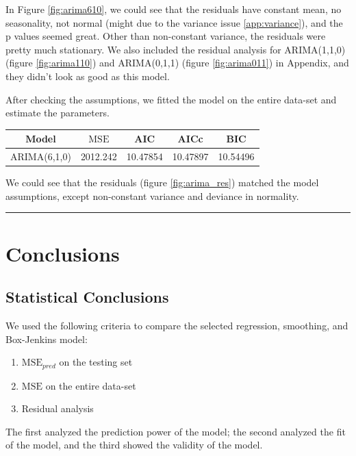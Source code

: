 \documentclass[paper=letter, fontsize=11pt]{scrartcl}
\begin{document}
In Figure \ref{fig:arima610}, we could see that the residuals have constant mean, no seasonality, not normal (might due to the variance issue \ref{app:variance}), and the p values seemed great. Other than non-constant variance, the residuals were pretty much stationary. 
We also included the residual analysis for ARIMA(1,1,0) (figure \ref{fig:arima110}) and ARIMA(0,1,1) (figure \ref{fig:arima011}) in Appendix, and they didn't look as good as this model.

After checking the assumptions, we fitted the model on the entire data-set and estimate the parameters. 

\begin{table}[ht]
    \centering
    \begin{tabular}{|c|c|c|c|c|}
     \hline
      Model  &  $\mathrm{MSE}$ &  AIC &  AICc &   BIC \\
      \hline\hline
      ARIMA(6,1,0) & 2012.242 & 10.47854 & 10.47897 & 10.54496 \\
    \hline
    \end{tabular}
    \label{tab:arima_fit_pred}
\end{table}

We could see that the residuals (figure \ref{fig:arima_res}) matched the model assumptions, except non-constant variance and deviance in normality.




\vspace{1cm}
\begin{center}
    \noindent\rule{10cm}{0.4pt}
\end{center}


\section{Conclusions}

\subsection{Statistical Conclusions}

We used the following criteria to compare the selected regression, smoothing, and Box-Jenkins model:
\begin{enumerate}
    \item $\mathrm{MSE}_{pred}$ on the testing set
    \item $\mathrm{MSE}$ on the entire data-set
    \item Residual analysis
\end{enumerate}
The first analyzed the prediction power of the model; the second analyzed the fit of the model, and the third showed the validity of the model.
\end{document}
